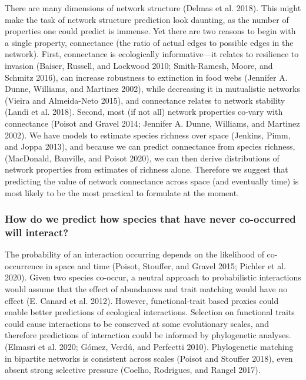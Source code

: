 \documentclass[10pt,oneside]{article}
\begin{document}
There are many dimensions of network structure (Delmas et al. 2018).
This might make the task of network structure prediction look daunting,
as the number of properties one could predict is immense. Yet there are
two reasons to begin with a single property, connectance (the ratio of
actual edges to possible edges in the network). First, connectance is
ecologically informative---it relates to resilience to invasion (Baiser,
Russell, and Lockwood 2010; Smith-Ramesh, Moore, and Schmitz 2016), can
increase robustness to extinction in food webs (Jennifer A. Dunne,
Williams, and Martinez 2002), while decreasing it in mutualistic
networks (Vieira and Almeida-Neto 2015), and connectance relates to
network stability (Landi et al. 2018). Second, most (if not all) network
properties co-vary with connectance (Poisot and Gravel 2014; Jennifer A.
Dunne, Williams, and Martinez 2002). We have models to estimate species
richness over space (Jenkins, Pimm, and Joppa 2013), and because we can
predict connectance from species richness, (MacDonald, Banville, and
Poisot 2020), we can then derive distributions of network properties
from estimates of richness alone. Therefore we suggest that predicting
the value of network connectance across space (and eventually time) is
most likely to be the most practical to formulate at the moment.

\hypertarget{how-do-we-predict-how-species-that-have-never-co-occurred-will-interact}{%
\subsubsection{How do we predict how species that have never co-occurred
will
interact?}\label{how-do-we-predict-how-species-that-have-never-co-occurred-will-interact}}

The probability of an interaction occurring depends on the likelihood of
co-occurrence in space and time (Poisot, Stouffer, and Gravel 2015;
Pichler et al. 2020). Given two species co-occur, a neutral approach to
probabilistic interactions would assume that the effect of abundances
and trait matching would have no effect (E. Canard et al. 2012).
However, functional-trait based proxies could enable better predictions
of ecological interactions. Selection on functional traits could cause
interactions to be conserved at some evolutionary scales, and therefore
predictions of interaction could be informed by phylogenetic analyses.
(Elmasri et al. 2020; Gómez, Verdú, and Perfectti 2010). Phylogenetic
matching in bipartite networks is consistent across scales (Poisot and
Stouffer 2018), even absent strong selective pressure (Coelho,
Rodrigues, and Rangel 2017).
\end{document}
